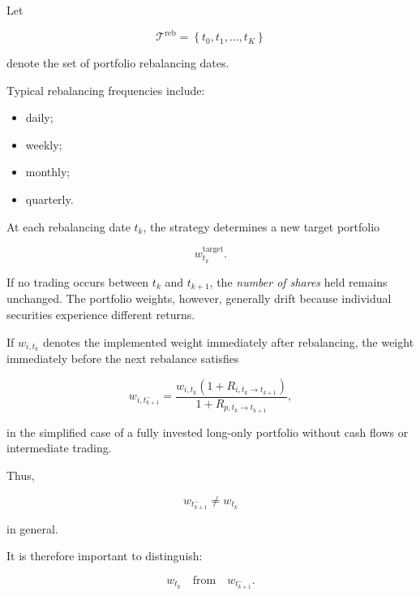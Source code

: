 \documentclass[11pt,a4paper]{article}
\begin{document}
Let

\begin{equation}
\mathcal{T}^{\mathrm{reb}}
=
\left\{
t_0,t_1,\ldots,t_K
\right\}
\end{equation}

denote the set of portfolio rebalancing dates.

Typical rebalancing frequencies include:

\begin{itemize}
    \item daily;

    \item weekly;

    \item monthly;

    \item quarterly.
\end{itemize}

At each rebalancing date $t_k$, the strategy determines a new target portfolio

\begin{equation}
w_{t_k}^{\mathrm{target}}.
\end{equation}

If no trading occurs between $t_k$ and $t_{k+1}$, the \emph{number of shares}
held remains unchanged. The portfolio weights, however, generally drift because
individual securities experience different returns.

If $w_{i,t_k}$ denotes the implemented weight immediately after rebalancing,
the weight immediately before the next rebalance satisfies

\begin{equation}
w_{i,t_{k+1}^{-}}
=
\frac{
w_{i,t_k}
\left(
1+R_{i,t_k\rightarrow t_{k+1}}
\right)
}{
1+
R_{p,t_k\rightarrow t_{k+1}}
},
\end{equation}

in the simplified case of a fully invested long-only portfolio without cash
flows or intermediate trading.

Thus,

\begin{equation}
w_{t_{k+1}^{-}}
\neq
w_{t_k}
\end{equation}

in general.

It is therefore important to distinguish:

\begin{equation}
\boxed{
w_{t_k}
\quad
\text{from}
\quad
w_{t_{k+1}^{-}}.
}
\end{equation}
\end{document}

